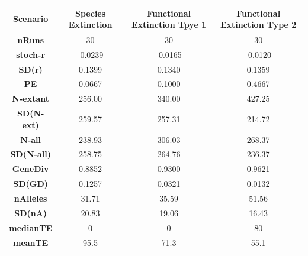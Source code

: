 \documentclass{mcmthesis}
\numberwithin{figure}{section}
\numberwithin{table}{section}
\numberwithin{equation}{section}
\begin{document}
\begin{table}[htbp]\label{Vortex_result_2}
  \begin{tabular}{
  >{\columncolor[HTML]{FFFFFF}}c |ccc}
  \textbf{Scenario} &
    \cellcolor[HTML]{FFFFFF}\textbf{Species Extinction} &
    \cellcolor[HTML]{FFFFFF}\textbf{Functional Extinction Tpye 1} &
    \cellcolor[HTML]{FFFFFF}\textbf{Functional Extinction Type 2} \\ \hline
  \textbf{nRuns}     & 30      & 30      & 30      \\
  \textbf{stoch-r}   & -0.0239 & -0.0165 & -0.0120 \\
  \textbf{SD(r)}     & 0.1399  & 0.1340  & 0.1359  \\
  \textbf{PE}        & 0.0667  & 0.1000  & 0.4667  \\
  \textbf{N-extant}  & 256.00  & 340.00  & 427.25  \\
  \textbf{SD(N-ext)} & 259.57  & 257.31  & 214.72  \\
  \textbf{N-all}     & 238.93  & 306.03  & 268.37  \\
  \textbf{SD(N-all)} & 258.75  & 264.76  & 236.37  \\
  \textbf{GeneDiv}   & 0.8852  & 0.9300  & 0.9621  \\
  \textbf{SD(GD)}    & 0.1257  & 0.0321  & 0.0132  \\
  \textbf{nAlleles}  & 31.71   & 35.59   & 51.56   \\
  \textbf{SD(nA)}    & 20.83   & 19.06   & 16.43   \\
  \textbf{medianTE}  & 0       & 0       & 80      \\
  \textbf{meanTE}    & 95.5    & 71.3    & 55.1   
  \end{tabular}
\end{table}
\end{document}
